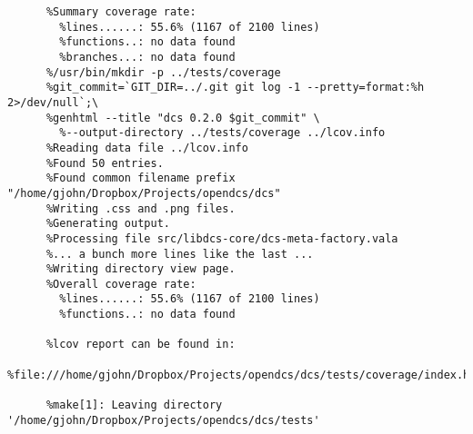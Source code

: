     \begin{lstlisting}[caption={Coverage Summary},label={lst:test-cov-summary}]
      %Writing data to ../lcov.info
      %Summary coverage rate:
        %lines......: 55.6% (1167 of 2100 lines)
        %functions..: no data found
        %branches...: no data found
      %/usr/bin/mkdir -p ../tests/coverage
      %git_commit=`GIT_DIR=../.git git log -1 --pretty=format:%h 2>/dev/null`;\
      %genhtml --title "dcs 0.2.0 $git_commit" \
        %--output-directory ../tests/coverage ../lcov.info
      %Reading data file ../lcov.info
      %Found 50 entries.
      %Found common filename prefix "/home/gjohn/Dropbox/Projects/opendcs/dcs"
      %Writing .css and .png files.
      %Generating output.
      %Processing file src/libdcs-core/dcs-meta-factory.vala
      %... a bunch more lines like the last ...
      %Writing directory view page.
      %Overall coverage rate:
        %lines......: 55.6% (1167 of 2100 lines)
        %functions..: no data found

      %lcov report can be found in:
      %file:///home/gjohn/Dropbox/Projects/opendcs/dcs/tests/coverage/index.html

      %make[1]: Leaving directory '/home/gjohn/Dropbox/Projects/opendcs/dcs/tests'
    \end{lstlisting}
